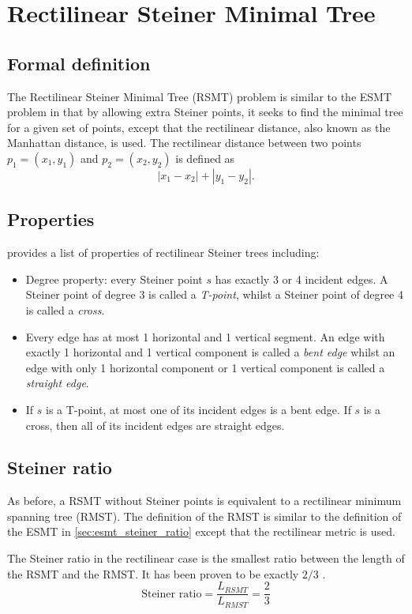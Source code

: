 \documentclass{l4proj}
\begin{document}
\section{Rectilinear Steiner Minimal Tree}
\subsection{Formal definition}
The Rectilinear Steiner Minimal Tree (RSMT) problem is similar to the ESMT problem in that by allowing extra Steiner points, it seeks to find the minimal tree for a given set of points, except that the rectilinear distance, also known as the Manhattan distance, is used. The rectilinear distance between two points $p_1 = (x_1, y_1)$ and $p_2 = (x_2, y_2)$ is defined as
$$|x_1 - x_2| + |y_1 - y_2|.$$
\subsection{Properties}
\cite{Brazil2015} provides a list of properties of rectilinear Steiner trees including:

\begin{itemize}
    \item Degree property: every Steiner point $s$ has exactly 3 or 4 incident edges. A Steiner point of degree 3 is called a \textit{T-point}, whilst a Steiner point of degree 4 is called a \textit{cross}.
    \item Every edge has at most 1 horizontal and 1 vertical segment. An edge with exactly 1 horizontal and 1 vertical component is called a \textit{bent edge} whilst an edge with only 1 horizontal component or 1 vertical component is called a \textit{straight edge}.
    \item If $s$ is a T-point, at most one of its incident edges is a bent edge. If $s$ is a cross, then all of its incident edges are straight edges.
\end{itemize}

\subsection{Steiner ratio}
As before, a RSMT without Steiner points is equivalent to a rectilinear minimum spanning tree (RMST). The definition of the RMST is similar to the definition of the ESMT in \ref{sec:esmt_steiner_ratio} except that the rectilinear metric is used.

The Steiner ratio in the rectilinear case is the smallest ratio between the length of the RSMT and the RMST. It has been proven to be exactly $2/3$ \cite{Brazil2015}.
$$
    \text{Steiner ratio} = \frac{L_{RSMT}}{L_{RMST}} = \frac{2}{3}
$$
\end{document}
